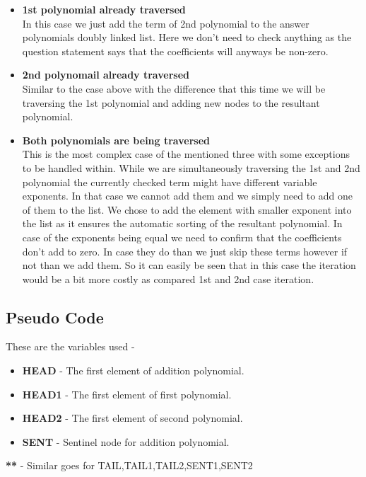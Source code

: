 \documentclass[20pt]{article}
\begin{document}
\begin{itemize}
\item \textbf{1st polynomial already traversed}
\\
In this case we just add the term of 2nd polynomial to the answer polynomials doubly linked list. Here we don't need to check anything as the question statement says that the coefficients will anyways be non-zero.

\item \textbf{2nd polynomail already traversed}
\\
Similar to the case above with the difference that this time we will be traversing the 1st polynomial and adding new nodes to the resultant polynomial.

\item \textbf{Both polynomials are being traversed}
\\
This is the most complex case of the mentioned three with some exceptions to be handled within. While we are simultaneously traversing the 1st and 2nd polynomial the currently checked term might have different variable exponents. In that case we cannot add them and we simply need to add one of them to the list. We chose to add the element with smaller exponent into the list as it ensures the automatic sorting of the resultant polynomial.
In case of the exponents being equal we need to confirm that the coefficients don't add to zero. In case they do than we just skip these terms however if not than we add them.
So it can easily be seen that in this case the iteration would be a bit more costly as compared 1st and 2nd case iteration.
\end{itemize}

\subsection{Pseudo Code}
These are the variables used - 
\begin{itemize}
\item \textbf{HEAD}   - The first element of addition polynomial.
\item \textbf{HEAD1} - The first element of first polynomial.
\item \textbf{HEAD2} - The first element of second polynomial.
\item \textbf{SENT}   - Sentinel node for addition polynomial.
\end{itemize}
\textbf{**} - Similar goes for {TAIL,TAIL1,TAIL2,SENT1,SENT2}

\newcommand\mycommfont[1]{\small\ttfamily\textcolor{blue}{#1}}
\end{document}
